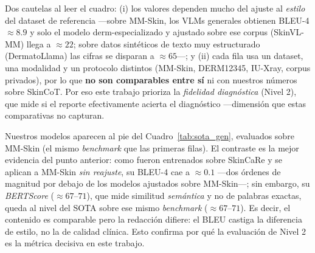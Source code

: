 \documentclass[11pt, a4paper]{article}
\begin{document}
Dos cautelas al leer el cuadro: (i) los valores dependen mucho del ajuste al \emph{estilo} del dataset de
referencia —sobre MM-Skin, los VLMs generales obtienen BLEU-4 $\approx 8.9$ y solo el modelo
derm-especializado y ajustado sobre ese corpus (SkinVL-MM) llega a $\approx 22$; sobre datos sintéticos
de texto muy estructurado (DermatoLlama) las cifras se disparan a $\approx 65$—; y (ii) cada fila usa un
dataset, una modalidad y un protocolo distintos (MM-Skin, DERM12345, IU-Xray, corpus privados), por lo
que \textbf{no son comparables entre sí} ni con nuestros números sobre SkinCoT. Por eso este trabajo
prioriza la \emph{fidelidad diagnóstica} (Nivel 2), que mide si el reporte efectivamente acierta el
diagnóstico —dimensión que estas comparativas no capturan.

Nuestros modelos aparecen al pie del Cuadro~\ref{tab:sota_gen}, evaluados sobre MM-Skin (el mismo
\emph{benchmark} que las primeras filas). El contraste es la mejor evidencia del punto anterior: como
fueron entrenados sobre SkinCaRe y se aplican a MM-Skin \emph{sin reajuste}, su BLEU-4 cae a
$\approx 0.1$ —dos órdenes de magnitud por debajo de los modelos ajustados sobre MM-Skin—; sin embargo,
su \emph{BERTScore} ($\approx 67$--$71$), que mide similitud \emph{semántica} y no de palabras exactas,
queda al nivel del SOTA sobre ese mismo \emph{benchmark} ($\approx 67$--$71$). Es decir, el contenido es
comparable pero la redacción difiere: el BLEU castiga la diferencia de estilo, no la de calidad clínica.
Esto confirma por qué la evaluación de Nivel 2 es la métrica decisiva en este trabajo.
\end{document}
